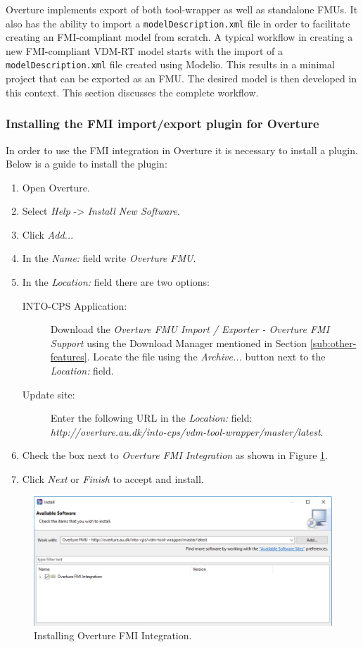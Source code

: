 Overture implements export of both tool-wrapper as well as standalone FMUs.
%
It also has the ability to import a \texttt{model\-Description.\allowbreak{}xml} file in order to facilitate creating an FMI-compliant model from scratch.
%
A typical workflow in creating a new FMI-compliant VDM-RT model starts with the import of a \texttt{model\-Description.\allowbreak{}xml} file created using Modelio.
%
This results in a minimal project that can be exported as an FMU.
%
The desired model is then developed in this context.
%
This section discusses the complete workflow.
%
%
%
\subsubsection{Installing the FMI import/export plugin for Overture}
In order to use the FMI integration in Overture it is necessary to install a plugin.
Below is a guide to install the plugin:
\begin{enumerate}
	\item Open Overture.
	\item Select \textit{Help} -> \textit{Install New Software}.
	\item Click \textit{Add..}.
	\item In the \textit{Name:} field write \textit{Overture FMU}.
	\item In the \textit{Location:} field there are two options:
		\begin{description}
			\item[INTO-CPS Application:] Download the \textit{Overture FMU Import / Exporter - Overture FMI Support} using the Download Manager mentioned in Section \ref{sub:other-features}. Locate the file using the \textit{Archive...} button next to the \textit{Location:} field.
			\item[Update site:] Enter the following URL in the \textit{Location:} field: \\ \textit{http://overture.au.dk/into-cps/vdm-tool-wrapper/master/latest}.
		\end{description}
	\item Check the box next to \textit{Overture FMI Integration} as shown in Figure \ref{fig:importFMIoverture}.
	\item Click \textit{Next} or \textit{Finish} to accept and install.
\end{enumerate}
\begin{figure}[ht]
	\centering
	\includegraphics[width=5in]{figures/installOvertureFmiIntegration.png}
	\caption{Installing Overture FMI Integration.}
	\label{fig:importFMIoverture}
\end{figure}
%
%
%
